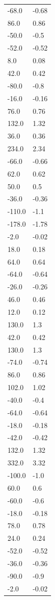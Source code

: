 \begin{longtable}{ll}
-68.0 & -0.68 \\
86.0 & 0.86 \\
-50.0 & -0.5 \\
-52.0 & -0.52 \\
8.0 & 0.08 \\
42.0 & 0.42 \\
-80.0 & -0.8 \\
-16.0 & -0.16 \\
76.0 & 0.76 \\
132.0 & 1.32 \\
36.0 & 0.36 \\
234.0 & 2.34 \\
-66.0 & -0.66 \\
62.0 & 0.62 \\
50.0 & 0.5 \\
-36.0 & -0.36 \\
-110.0 & -1.1 \\
-178.0 & -1.78 \\
-2.0 & -0.02 \\
18.0 & 0.18 \\
64.0 & 0.64 \\
-64.0 & -0.64 \\
-26.0 & -0.26 \\
46.0 & 0.46 \\
12.0 & 0.12 \\
130.0 & 1.3 \\
42.0 & 0.42 \\
130.0 & 1.3 \\
-74.0 & -0.74 \\
86.0 & 0.86 \\
102.0 & 1.02 \\
-40.0 & -0.4 \\
-64.0 & -0.64 \\
-18.0 & -0.18 \\
-42.0 & -0.42 \\
132.0 & 1.32 \\
332.0 & 3.32 \\
-100.0 & -1.0 \\
60.0 & 0.6 \\
-60.0 & -0.6 \\
-18.0 & -0.18 \\
78.0 & 0.78 \\
24.0 & 0.24 \\
-52.0 & -0.52 \\
-36.0 & -0.36 \\
-90.0 & -0.9 \\
-2.0 & -0.02 \\

\end{longtable}
